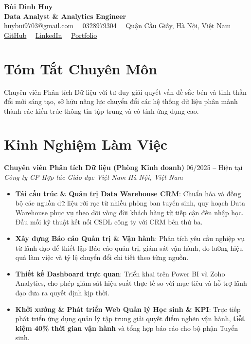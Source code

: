 \documentclass[11pt,a4paper]{article}
\begin{document}
\begin{center}
    {\Huge \bfseries \color{darkgray} Bùi Đình Huy}\\[4pt]
    {\large \bfseries \color{primary} Data Analyst \& Analytics Engineer}\\[5pt]
    \small \color{mediumgray} huybui9703@gmail.com \ \textbullet \ 0328979304 \ \textbullet \ Quận Cầu Giấy, Hà Nội, Việt Nam\\
    \small \href{https://github.com/dewey97}{GitHub} \ \textbullet \ \href{https://www.linkedin.com/in/dinh-huy-bui/}{LinkedIn} \ \textbullet \ \href{https://dinhhuybui.dev}{Portfolio}
\end{center}

\vspace{-4pt}

\section*{Tóm Tắt Chuyên Môn}
\color{darkgray} Chuyên viên Phân tích Dữ liệu với tư duy giải quyết vấn đề sắc bén và tinh thần đổi mới sáng tạo, sở hữu năng lực chuyển đổi các hệ thống dữ liệu phân mảnh thành các kiến trúc thông tin tập trung và có tính ứng dụng cao.

\section*{Kinh Nghiệm Làm Việc}
\color{darkgray} \textbf{Chuyên viên Phân tích Dữ liệu (Phòng Kinh doanh)} \hfill 06/2025 -- Hiện tại\\
\textit{Công ty CP Hợp tác Giáo dục Việt Nam} \hfill \textit{Hà Nội, Việt Nam}
\begin{itemize}
  \item \textbf{Tái cấu trúc \& Quản trị Data Warehouse CRM}: Chuẩn hóa và đồng bộ các nguồn dữ liệu rời rạc từ nhiều phòng ban tuyển sinh, quy hoạch Data Warehouse phục vụ theo dõi vòng đời khách hàng từ tiếp cận đến nhập học. Đầu mối kỹ thuật kết nối CSDL công ty với CRM bên thứ ba.
  \item \textbf{Xây dựng Báo cáo Quản trị \& Vận hành}: Phân tích yêu cầu nghiệp vụ từ lãnh đạo để thiết lập Báo cáo quản trị, giám sát vận hành, đo lường hiệu quả làm việc và tỷ lệ chuyển đổi chi tiết theo từng nguồn.
  \item \textbf{Thiết kế Dashboard trực quan}: Triển khai trên Power BI và Zoho Analytics, cho phép giám sát hiệu suất thực tế so với mục tiêu và hỗ trợ lãnh đạo đưa ra quyết định kịp thời.
  \item \textbf{Khởi xướng \& Phát triển Web Quản lý Học sinh \& KPI}: Trực tiếp phát triển ứng dụng quản lý tập trung giải quyết điểm nghẽn vận hành, \textbf{tiết kiệm 40\% thời gian vận hành} và tổng hợp báo cáo cho bộ phận Tuyển sinh.
\end{itemize}
\vspace{4pt}
\end{document}
